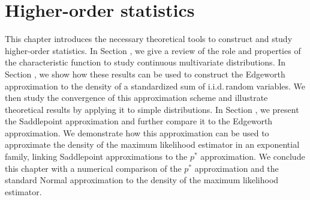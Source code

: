 \section{Higher-order statistics} \label{sec-ho-stats}

This chapter introduces the necessary theoretical tools to construct and study higher-order statistics. In Section , we give a review of the role and properties of the characteristic function to study continuous multivariate distributions. In Section , we show how these results can be used to construct the Edgeworth approximation to the density of a standardized sum of i.i.d.\,random variables. We then study the convergence of this approximation scheme and illustrate theoretical results by applying it to simple distributions. In Section , we present the Saddlepoint approximation and further compare it to the Edgeworth approximation. We demonstrate how this approximation can be used to approximate the density of the maximum likelihood estimator in an exponential family, linking Saddlepoint approximations to the $p^*$ approximation. We conclude this chapter with a numerical comparison of the $p^*$ approximation and the standard Normal approximation to the density of the maximum likelihood estimator.







